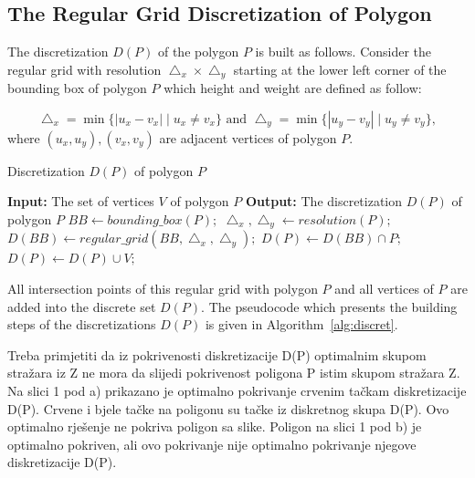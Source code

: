\documentclass[runningheads,a4paper]{elsarticle}
\begin{document}
	
	\subsection{The Regular Grid Discretization of Polygon}\label{sec:regulardiscretization}
	The discretization $D(P)$ of the polygon $P$ is built as follows. Consider the regular grid with resolution $\bigtriangleup_{x}\times\bigtriangleup_{y}$ starting at the lower left corner of the bounding box of polygon $P$ which height and weight are defined as follow:

	\begin{equation}
         \bigtriangleup_{x}=\min\{ |u_{x}-v_{x}|\mid u_{x}\neq v_{x}\} \mbox{ and }
         \bigtriangleup_{y}=\min\{ |u_{y}-v_{y}|\mid u_{y}\neq v_{y}\},
 	\end{equation}
where $ (u_{x},u_{y}),(v_{x},v_{y})$ are adjacent vertices of polygon $P$.
	
	\begin{algorithm}[!t]
		\caption{Discretization $D(P)$ of polygon $P$}\label{alg:discret}
		\begin{algorithmic}[1]
			\State \textbf{Input:} The set of vertices $V$ of polygon $P$
			\State \textbf{Output:} The discretization $D(P)$ of polygon $P$
			\State $BB \gets bounding\_box(P);$
			\State $\bigtriangleup_{x},\bigtriangleup_{y} \gets resolution(P);$
			\State $D(BB) \gets regular\_grid(BB,\bigtriangleup_{x},\bigtriangleup_{y});$
			\State $D(P) \gets D(BB) \cap P;$
			\State $D(P) \gets D(P) \cup V;$
		\end{algorithmic}
	\end{algorithm}

	All intersection points of this regular grid with polygon $P$ and all vertices of $P$ are added into the discrete set $D(P)$. The pseudocode which presents the building steps of the discretizations $D(P)$ is given in Algorithm~\ref{alg:discret}.
	
	
	Treba primjetiti da iz pokrivenosti diskretizacije D(P) optimalnim skupom stražara iz Z ne mora da slijedi pokrivenost poligona P istim skupom stražara Z. Na slici 1 pod a) prikazano je optimalno pokrivanje crvenim tačkam diskretizacije D(P). Crvene i bjele tačke na poligonu su tačke iz diskretnog skupa D(P). Ovo optimalno rješenje ne pokriva poligon sa slike. Poligon na slici 1 pod b) je optimalno pokriven, ali ovo pokrivanje nije optimalno pokrivanje njegove diskretizacije D(P). 
	
\end{document}
